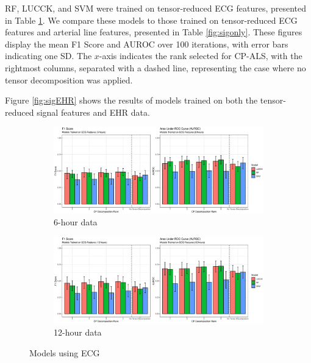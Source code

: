 RF, LUCCK, and SVM were trained on tensor-reduced ECG features, presented in Table \ref{fig:ecgonly}. We compare these models to those trained on tensor-reduced ECG features and arterial line features, presented in Table \ref{fig:sigonly}. These figures display the mean F1 Score and AUROC over 100 iterations, with error bars indicating one SD. The $x$-axis indicates the rank selected for CP-ALS, with the rightmost columns, separated with a dashed line, representing the case where no tensor decomposition was applied.

Figure \ref{fig:sigEHR} shows the results of models trained on both the tensor-reduced signal features and EHR data.

\begin{figure}[htb]
    \centering
    \begin{subfigure}[htb]{\textwidth}
        \includegraphics[width=\textwidth]{body/figures/ecg_6.eps}
        \caption{6-hour data}
    \end{subfigure}
    \hfill
    \begin{subfigure}[htb]{\textwidth}
        \includegraphics[width=\textwidth]{body/figures/ecg_12.eps}
        \caption{12-hour data}
    \end{subfigure}
    \caption{Models using ECG}
    \label{fig:ecgonly}
\end{figure}  %


